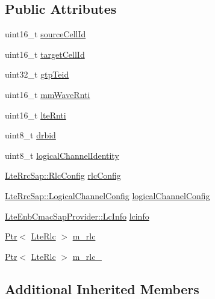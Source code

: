 \subsection*{Public Attributes}
\begin{DoxyCompactItemize}
\item 
uint16\+\_\+t \hyperlink{classns3_1_1RlcBearerInfo_a011fd56ec0eb36c5cf7bf36c571612b0}{source\+Cell\+Id}
\item 
uint16\+\_\+t \hyperlink{classns3_1_1RlcBearerInfo_a9dfbbfd620995744d57e6d6425f0d85d}{target\+Cell\+Id}
\item 
uint32\+\_\+t \hyperlink{classns3_1_1RlcBearerInfo_a51df5a7331c50a91ff829f805a4b104d}{gtp\+Teid}
\item 
uint16\+\_\+t \hyperlink{classns3_1_1RlcBearerInfo_a6b8fe8415200ab3ff70a075c1946934c}{mm\+Wave\+Rnti}
\item 
uint16\+\_\+t \hyperlink{classns3_1_1RlcBearerInfo_a325a88c25737adcee77bb11f0f11740c}{lte\+Rnti}
\item 
uint8\+\_\+t \hyperlink{classns3_1_1RlcBearerInfo_abed2c8157fb5b9a2892af14c22790c39}{drbid}
\item 
uint8\+\_\+t \hyperlink{classns3_1_1RlcBearerInfo_a88e2a6f100b5ac65d13ae29c7502cdbc}{logical\+Channel\+Identity}
\item 
\hyperlink{structns3_1_1LteRrcSap_1_1RlcConfig}{Lte\+Rrc\+Sap\+::\+Rlc\+Config} \hyperlink{classns3_1_1RlcBearerInfo_a4847cf50401b318e8886955de63befc6}{rlc\+Config}
\item 
\hyperlink{structns3_1_1LteRrcSap_1_1LogicalChannelConfig}{Lte\+Rrc\+Sap\+::\+Logical\+Channel\+Config} \hyperlink{classns3_1_1RlcBearerInfo_af25574eca7ce23b26f30cc4f30eaabc8}{logical\+Channel\+Config}
\item 
\hyperlink{structns3_1_1LteEnbCmacSapProvider_1_1LcInfo}{Lte\+Enb\+Cmac\+Sap\+Provider\+::\+Lc\+Info} \hyperlink{classns3_1_1RlcBearerInfo_a4a548c1dfb0bda3fc3234b613b1bc6a8}{lcinfo}
\item 
\hyperlink{classns3_1_1Ptr}{Ptr}$<$ \hyperlink{classns3_1_1LteRlc}{Lte\+Rlc} $>$ \hyperlink{classns3_1_1RlcBearerInfo_ad1bb71e4a788426a913cb207269ba5b5}{m\+\_\+rlc}
\item 
\hyperlink{classns3_1_1Ptr}{Ptr}$<$ \hyperlink{classns3_1_1LteRlc}{Lte\+Rlc} $>$ \hyperlink{classns3_1_1RlcBearerInfo_af233f6a15cebe618c6b0e0ec4098deb5}{m\+\_\+rlc\+\_}
\end{DoxyCompactItemize}
\subsection*{Additional Inherited Members}


